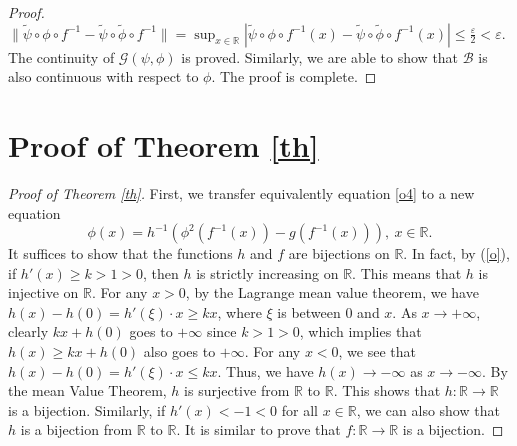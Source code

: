 \documentclass[11pt,reqno,a4paper]{amsart}
\numberwithin{equation}{section}
\renewcommand{\epsilon}{\varepsilon}
\begin{document}
\begin{proof}
$\|\tilde \psi \circ \phi \circ f^{-1}-\tilde \psi \circ \tilde{\phi} \circ f^{-1}\| =\sup_{x \in \mathbb{R}}|\tilde\psi \circ \phi \circ f^{-1}(x)-\tilde\psi \circ \tilde{\phi} \circ f^{-1}(x)| \le \frac{\epsilon}{2} < \epsilon.$
The continuity of $\mathcal{G} (\psi,\phi)$ is proved. 
Similarly, we are able to show that $\mathcal{B}$ is also continuous with respect to $\phi$. The proof is complete.
\end{proof}




\section{Proof of Theorem \ref{th}}\label{proof}


\begin{proof}[Proof of Theorem \ref{th}]
First, we transfer equivalently equation \eqref{o4} to a new equation
\begin{equation}\label{11}
\phi(x)=h^{-1}(\phi^{2}(f^{-1}(x))-g(f^{-1}(x))),~ x\in \mathbb{R}.
\end{equation}
It suffices to show that the functions $h$ and $f$ are bijections on $\mathbb{R}$. 
In fact, by (\ref{o}), if $h'(x)\geq k>1>0$, then $h$  is strictly increasing on $\mathbb{R}$. 
This means that $h$ is injective on $\mathbb{R}$.
For any $x > 0$, by the Lagrange mean value theorem, we have
$h(x) - h(0) = h'(\xi) \cdot x \geq kx$, where $\xi $ is between $ 0 $ and $ x $. As $x \to +\infty $,  clearly $ kx + h(0)$ goes to $+\infty$ since $k>1>0$, which implies that $h(x) \geq kx + h(0)$ also goes to $+\infty$.
For any $ x < 0 $, we see that
$h(x) - h(0) = h'(\xi) \cdot x \leq kx$. Thus, we have $h(x)\to -\infty$ as  $ x \to -\infty$.
By the mean Value Theorem, $h$ is surjective from $\mathbb{R}$ to $\mathbb{R}$. This shows that $h:\mathbb{R}\to \mathbb{R}$ is a bijection. Similarly, if $h'(x)<-1<0$ for all $x\in \mathbb{R}$, we can also show that $h$ is a bijection from $\mathbb{R}$ to $\mathbb{R}$. It is similar to prove that $f:\mathbb{R}\to \mathbb{R}$ is a bijection.





\end{proof}
\end{document}

